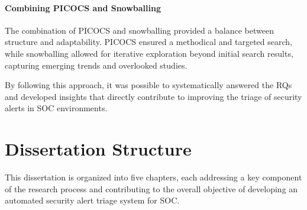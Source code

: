 \paragraph{Combining PICOCS and Snowballing} The combination of PICOCS and snowballing provided a balance between structure and adaptability. 
PICOCS ensured a methodical and targeted search, while snowballing allowed for iterative exploration beyond initial search results, capturing emerging trends and overlooked studies.

By following this approach, it was possible to systematically answered the RQs and developed insights that directly contribute to improving the triage of security alerts in SOC environments.






\section{Dissertation Structure}

This dissertation is organized into five chapters, each addressing a key component of the research process and contributing to the overall objective of developing an automated security alert triage system for \gls{SOC}.

